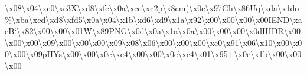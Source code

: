 \begin{DoxyCompactItemize}
\textbackslash{}x08\textbackslash{}x04\textbackslash{}xc0\textbackslash{}xc3\+X\textbackslash{}xd8\textbackslash{}xfe\textbackslash{}x0a\textbackslash{}xcc\textbackslash{}xc2p\textbackslash{}x8cm(\textbackslash{}x0e\textbackslash{}x97\+Gh\textbackslash{}x86\+Uq\textbackslash{}xda\textbackslash{}x1do\%\textbackslash{}xba\textbackslash{}xcd\textbackslash{}xd8\textbackslash{}xfd5\textbackslash{}x0a\textbackslash{}x04\textbackslash{}x1b\textbackslash{}xd6\textbackslash{}xd9\textbackslash{}x1a\textbackslash{}x92\textbackslash{}x00\textbackslash{}x00\textbackslash{}x00\textbackslash{}x00\+I\+E\+N\+D\textbackslash{}xae\+B`\textbackslash{}x82\textbackslash{}x00\textbackslash{}x00\textbackslash{}x01\+W\textbackslash{}x89\+P\+N\+G\textbackslash{}x0d\textbackslash{}x0a\textbackslash{}x1a\textbackslash{}x0a\textbackslash{}x00\textbackslash{}x00\textbackslash{}x00\textbackslash{}x0d\+I\+H\+D\+R\textbackslash{}x00\textbackslash{}x00\textbackslash{}x00\textbackslash{}x09\textbackslash{}x00\textbackslash{}x00\textbackslash{}x00\textbackslash{}x09\textbackslash{}x08\textbackslash{}x06\textbackslash{}x00\textbackslash{}x00\textbackslash{}x00\textbackslash{}xe0\textbackslash{}x91\textbackslash{}x06\textbackslash{}x10\textbackslash{}x00\textbackslash{}x00\textbackslash{}x00\textbackslash{}x09p\+H\+Ys\textbackslash{}x00\textbackslash{}x00\textbackslash{}x0e\textbackslash{}xc4\textbackslash{}x00\textbackslash{}x00\textbackslash{}x0e\textbackslash{}xc4\textbackslash{}x01\textbackslash{}x95+\textbackslash{}x0e\textbackslash{}x1b\textbackslash{}x00\textbackslash{}x00\textbackslash{}x00 
\end{DoxyCompactItemize}
